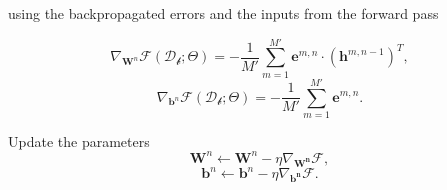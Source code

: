 \begin{algorithm}[th!]
\begin{algorithmic}[1]
		\vspace{0.3cm}
         using the backpropagated errors and the inputs from the forward pass

        $$\nabla_{\mathbf{W}^n}\mathcal{F}(\mathcal{D_b};\Theta)  = -\frac{1}{M'} \sum_{m=1}^{M'} \mathbf{e}^{m,n} \cdot \left(\mathbf{h}^{m,n-1}\right)^T,$$
        $$\nabla_{\mathbf{b}^n}\mathcal{F}(\mathcal{D_b};\Theta)  = - \frac{1}{M'} \sum_{m=1}^{M'} \mathbf{e}^{m,n}.$$

		\vspace{0.3cm}
        \STATE Update the parameters
            $$\mathbf{W}^n \leftarrow \mathbf{W}^n - \eta \nabla_\mathbf{W^n}\mathcal{F},$$
            $$\mathbf{b}^n \leftarrow \mathbf{b}^n - \eta \nabla_\mathbf{b^n}\mathcal{F}.$$

	\ENDFOR

	\ENDFOR
	\ENDFOR
\end{algorithmic}
\end{algorithm}

\clearpage

